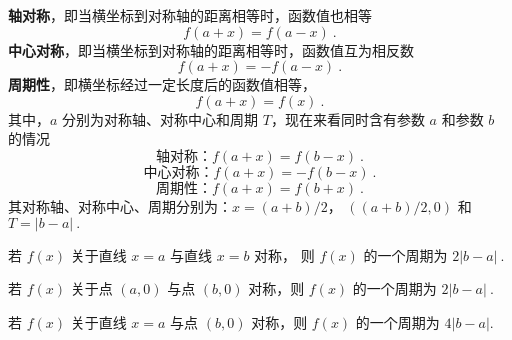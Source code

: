 

\textbf{轴对称}，即当横坐标到对称轴的距离相等时，函数值也相等
\begin{equation}
f\left( {a + x} \right) = f\left( {a - x} \right)~.
\end{equation}
\textbf{中心对称}，即当横坐标到对称轴的距离相等时，函数值互为相反数
\begin{equation}
f\left( {a + x} \right) =  - f\left( {a - x} \right)~.
\end{equation}
\textbf{周期性}，即横坐标经过一定长度后的函数值相等，
\begin{equation}
f\left( {a + x} \right) = f\left( x \right)~.
\end{equation}
其中，$a$ 分别为对称轴、对称中心和周期 $T$，现在来看同时含有参数 $a$ 和参数 $b$ 的情况
\begin{equation}
\text{轴对称：} f\left( {a + x} \right) = f\left( {b - x} \right)~.
\end{equation}
\begin{equation}
\text{中心对称：} f\left( {a + x} \right) =  - f\left( {b - x} \right)~.
\end{equation}
\begin{equation}
\text{周期性：} f\left( {a + x} \right) = f\left( {b + x} \right)~.
\end{equation}
其对称轴、对称中心、周期分别为：$x = (a + b)/2$， $((a + b)/2, 0)$ 和 $T = \left| {b - a} \right|~.$

若 $f(x)$ 关于直线 $x=a$ 与直线 $x=b$ 对称， 则 $f(x)$ 的一个周期为 $2\left| {b - a} \right|~.$

若 $f(x)$ 关于点 $(a,0)$ 与点 $(b,0)$ 对称，则 $f(x)$ 的一个周期为 $2\left| {b - a} \right|~.$

若 $f(x)$ 关于直线 $x=a$ 与点 $(b,0)$ 对称，则 $f(x)$ 的一个周期为 $4\left| {b - a} \right|.$
